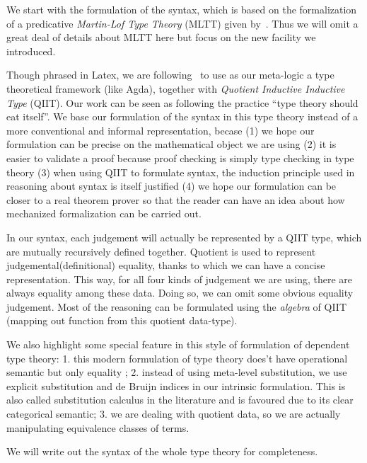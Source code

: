
We start with the formulation of the syntax, which is based on the formalization of a predicative \textit{Martin-Lof Type Theory} (MLTT) given by~\citet{coquand2018canonicity}. Thus we will omit a great deal of details about MLTT here but focus on the new facility we introduced. 

Though phrased in Latex, we are following~\citet{altkap2016} to use as
our meta-logic a type theoretical framework (like Agda), 
together with \textit{Quotient Inductive Inductive Type} (QIIT). Our work can be seen as following the practice ``type theory should eat itself''\cite{dybjer1995internal, chapman2009type}. We base our formulation of the syntax in this type theory instead of a more conventional and informal representation, becase (1) we hope our formulation can be precise on the mathematical object we are using (2) it is easier to validate a proof because proof checking is simply type checking in type theory (3) when using QIIT to formulate syntax, the induction principle used in reasoning about syntax is itself justified (4) we hope our formulation can be closer to a real theorem prover so that the reader can have an idea about how mechanized formalization can be carried out.

In our syntax, each judgement will actually be represented by a QIIT type, which are
mutually recursively defined together. Quotient is used to represent
judgemental(definitional) equality, thanks to which we can have a
concise representation. This way, for all four kinds of judgement we are
using, there are always equality among these data. Doing so, we can omit
some obvious equality judgement. Most of the reasoning can be formulated
using the \textit{algebra} of QIIT (mapping out function from this
quotient data-type). 

We also highlight some special feature in this style of formulation of dependent type theory: 1. this modern formulation of type theory does't have operational semantic but only equality 
;
2. instead of using meta-level substitution, we use explicit substitution and de Bruijn indices in our intrinsic formulation. This is also called substitution calculus in the literature and is favoured due to its clear categorical semantic; 
3. we are dealing with quotient data, so we are actually manipulating equivalence classes of terms. 

We will write out the syntax of the whole type theory for completeness.






